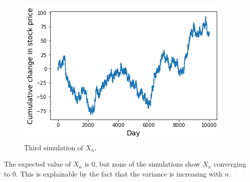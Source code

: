 \begin{ex}
\begin{enumerate}[(a)]
          \begin{figure}[H]
            \centering
            \includegraphics[scale=0.8]{part1/ch03-11c}
            \caption{Third simulation of $X_n$.}
          \end{figure}

          The expected value of $X_n$ is $0$, but none of the simulations show
          $X_n$ converging to $0$. This is explainable by the fact that the
          variance is increasing with $n$.
  \end{enumerate}
\end{ex}

